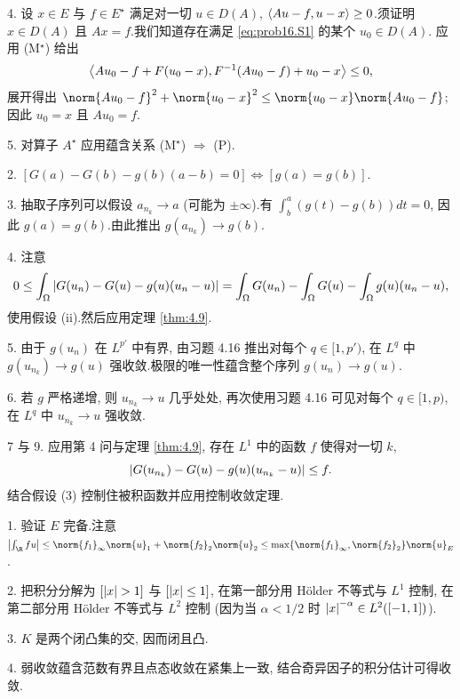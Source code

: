 4. 设 $x\in E$ 与 $f\in E^\star$ 满足对一切 $u\in D(A)$, $\left\langle Au-f,u-x\right\rangle\ge0$.须证明
$x\in D(A)$ 且 $Ax=f$.我们知道存在满足 \eqref{eq:prob16.S1} 的某个 $u_0\in D(A)$.
应用 (M$^\star$) 给出
\begin{equation*}
\left\langle Au_0-f+F(u_0-x),F^{-1}(Au_0-f)+u_0-x\right\rangle\le0,
\end{equation*}
展开得出 $\norm{Au_0-f}^2+\norm{u_0-x}^2\le\norm{u_0-x}\norm{Au_0-f}$; 因此
$u_0=x$ 且 $Au_0=f$.

5. 对算子 $A^\star$ 应用蕴含关系 (M$^\star$) $\Rightarrow$ (P).


2. $[G(a)-G(b)-g(b)(a-b)=0]\iff[g(a)=g(b)]$.

3. 抽取子序列可以假设 $a_{n_k}\to a$ (可能为 $\pm\infty$).有
$\int_b^a(g(t)-g(b))dt=0$, 因此 $g(a)=g(b)$.由此推出 $g(a_{n_k})\to g(b)$.

4. 注意
\begin{equation*}
0\le\int_\Omega\left|G(u_n)-G(u)-g(u)(u_n-u)\right|=\int_\Omega G(u_n)-\int_\Omega G(u)-\int_\Omega g(u)(u_n-u),
\end{equation*}
使用假设 (ii).然后应用定理  \ref{thm:4.9}.

5. 由于 $g(u_n)$ 在 $L^{p'}$ 中有界, 由习题 4.16 推出对每个 $q\in[1,p')$, 在 $L^q$ 中
$g(u_{n_k})\to g(u)$ 强收敛.极限的唯一性蕴含整个序列 $g(u_n)\to g(u)$.

6. 若 $g$ 严格递增, 则 $u_{n_k}\to u$ 几乎处处, 再次使用习题 4.16 可见对每个 $q\in[1,p)$,
在 $L^q$ 中 $u_{n_k}\to u$ 强收敛.

7 与 9. 应用第 4 问与定理  \ref{thm:4.9}, 存在 $L^1$ 中的函数 $f$ 使得对一切 $k$,
\begin{equation*}
\left|G(u_{n_k})-G(u)-g(u)(u_{n_k}-u)\right|\le f.
\end{equation*}
结合假设 (3) 控制住被积函数并应用控制收敛定理.


1. 验证 $E$ 完备.注意 $\abs{\int_\R fu}\le\norm{f_1}_\infty\norm{u}_1+\norm{f_2}_2\norm{u}_2\le\max\{\norm{f_1}_\infty,\norm{f_2}_2\}\norm{u}_E$.

2. 把积分分解为 $[\abs{x}>1]$ 与 $[\left|x\right|\le1]$, 在第一部分用 Hölder 不等式与 $L^1$ 控制,
在第二部分用 Hölder 不等式与 $L^2$ 控制 (因为当 $\alpha<1/2$ 时 $\left|x\right|^{-\alpha}\in L^2([-1,1])$).

3. $K$ 是两个闭凸集的交, 因而闭且凸.

4. 弱收敛蕴含范数有界且点态收敛在紧集上一致, 结合奇异因子的积分估计可得收敛.

